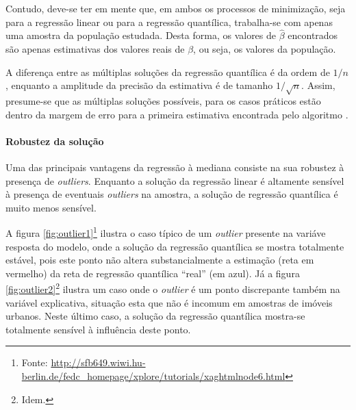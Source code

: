 \documentclass[a4paper, 12pt]{article}
\let\oldparagraph\paragraph
\renewcommand{\paragraph}[1]{\oldparagraph{#1}\mbox{}}
\let\rmarkdownfootnote\footnote%
\def\footnote{\protect\rmarkdownfootnote}
\begin{document}
Contudo, deve-se ter em mente que, em ambos os processos de minimização,
seja para a regressão linear ou para a regressão quantílica, trabalha-se
com apenas uma amostra da população estudada. Desta forma, os valores de
\(\hat \beta\) encontrados são apenas estimativas dos valores reais de
\(\beta\), ou seja, os valores da população.

A diferença entre as múltiplas soluções da regressão quantílica é da
ordem de \(1/n\), enquanto a amplitude da precisão da estimativa é de
tamanho \(1/\sqrt{n}\). Assim, presume-se que as múltiplas soluções
possíveis, para os casos práticos estão dentro da margem de erro para a
primeira estimativa encontrada pelo algoritmo \autocite{basset}.

\hypertarget{robustez-da-solucao}{%
\paragraph{Robustez da solução}\label{robustez-da-solucao}}

Uma das principais vantagens da regressão à mediana consiste na sua
robustez à presença de \emph{outliers}. Enquanto a solução da regressão
linear é altamente sensível à presença de eventuais \emph{outliers} na
amostra, a solução de regressão quantílica é muito menos sensível.

A figura \ref{fig:outlier1}\footnote{Fonte:
  \url{http://sfb649.wiwi.hu-berlin.de/fedc_homepage/xplore/tutorials/xaghtmlnode6.html}}
ilustra o caso típico de um \emph{outlier} presente na variáve resposta
do modelo, onde a solução da regressão quantílica se mostra totalmente
estável, pois este ponto não altera substancialmente a estimação (reta
em vermelho) da reta de regressão quantílica ``real'' (em azul). Já a
figura \ref{fig:outlier2}\footnote{Idem.} ilustra um caso onde o
\emph{outlier} é um ponto discrepante também na variável explicativa,
situação esta que não é incomum em amostras de imóveis urbanos. Neste
último caso, a solução da regressão quantílica mostra-se totalmente
sensível à influência deste ponto.
\end{document}
